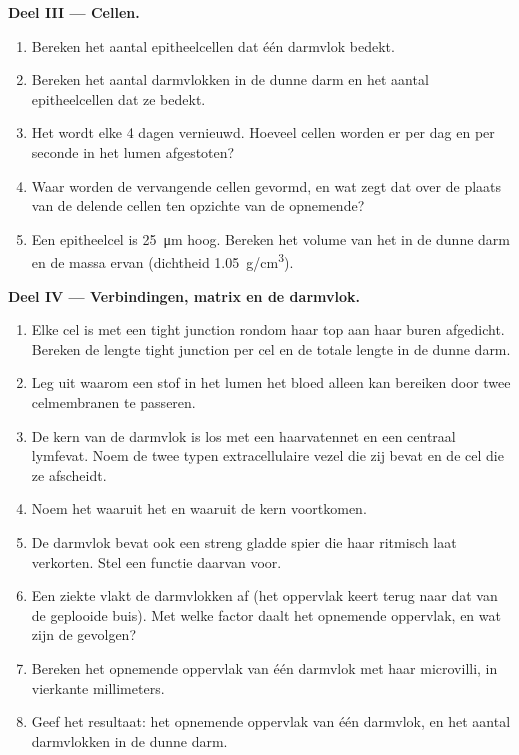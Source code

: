 \begin{problem}
\medskip
\noindent\textbf{Deel III --- Cellen.}
\begin{enumerate}[resume]
  \item Bereken het aantal epitheelcellen dat één darmvlok bedekt.
  \item Bereken het aantal darmvlokken in de dunne darm en het aantal
        epitheelcellen dat ze bedekt.
  \item Het  wordt elke \qty{4}{} dagen vernieuwd. Hoeveel cellen
        worden er per dag en per seconde in het lumen afgestoten?
  \item Waar worden de vervangende cellen gevormd, en wat zegt dat over de
        plaats van de delende cellen ten opzichte van de opnemende?
  \item Een epitheelcel is \qty{25}{\micro m} hoog. Bereken het volume van
        het  in de dunne darm en de massa ervan (dichtheid
        \qty{1.05}{g/cm^3}).
\end{enumerate}

\medskip
\noindent\textbf{Deel IV --- Verbindingen, matrix en de darmvlok.}
\begin{enumerate}[resume]
  \item Elke cel is met een tight junction rondom haar top aan haar buren
        afgedicht. Bereken de lengte tight junction per cel en de totale
        lengte in de dunne darm.
  \item Leg uit waarom een stof in het lumen het bloed alleen kan bereiken
        door twee celmembranen te passeren.
  \item De kern van de darmvlok is los  met een haarvatennet en
        een centraal lymfevat. Noem de twee typen extracellulaire vezel
        die zij bevat en de cel die ze afscheidt.
  \item Noem het  waaruit het  en waaruit de kern
        voortkomen.
  \item De darmvlok bevat ook een streng gladde spier die haar ritmisch
        laat verkorten. Stel een functie daarvan voor.
  \item Een ziekte vlakt de darmvlokken af (het oppervlak keert terug naar
        dat van de geplooide buis). Met welke factor daalt het opnemende
        oppervlak, en wat zijn de gevolgen?
  \item Bereken het opnemende oppervlak van één darmvlok met haar
        microvilli, in vierkante millimeters.
  \item Geef het resultaat: het opnemende oppervlak van één darmvlok, en
        het aantal darmvlokken in de dunne darm.
\end{enumerate}
\end{problem}
